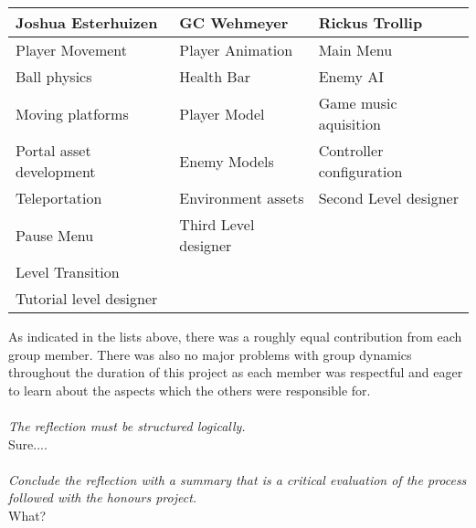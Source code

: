 \begin{table}[H]
\begin{tabular}{l|l|l}
\hline
Joshua Esterhuizen       & GC Wehmeyer          & Rickus Trollip           \\ \hline
Player Movement          & Player Animation     & Main Menu                \\
Ball physics             & Health Bar           & Enemy AI                 \\
Moving platforms         & Player Model         & Game music aquisition    \\
Portal asset development & Enemy Models         & Controller configuration \\
Teleportation            & Environment assets   & Second Level designer    \\
Pause Menu               & Third Level designer &                          \\
Level Transition         &                      &                          \\
Tutorial level designer  &                      &                          \\ \hline
\end{tabular}
\end{table}


\noindent As indicated in the lists above, there was a roughly equal contribution from each group member. There was also no major problems with group dynamics throughout the duration of this project as each member was respectful and eager to learn about the aspects which the others were responsible for.
\\\\
\indent \textit{The reflection must be structured logically.}
\\
Sure....
\\\\
\indent \textit{Conclude the reflection with a summary that is a critical evaluation of the process followed with the honours project.}
\\
What?

